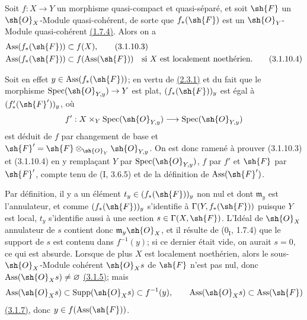 \begin{remark}[3.1.10.2]
\label{IV.3.1.10.2}
Soit $f:X\to Y$ un morphisme quasi-compact et quasi-séparé, et soit
$\sh{F}$ un $\sh{O}_X$-Module quasi-cohérent, de sorte que
$f_*(\sh{F})$ est un $\sh{O}_Y$-Module quasi-cohérent
{\hyperref[canon-index.ega4.c04.statement.1-7-4]{(1.7.4)}}. Alors on a
\begin{align}
 \operatorname{Ass}(f_*(\sh{F}))&\subset f(X),
 \label{IV.3.1.10.3}\tag{3.1.10.3}\\
 \operatorname{Ass}(f_*(\sh{F}))&\subset f(\operatorname{Ass}(\sh{F}))
 \quad\text{si $X$ est localement noethérien}.
 \label{IV.3.1.10.4}\tag{3.1.10.4}
\end{align}

Soit en effet $y\in\operatorname{Ass}(f_*(\sh{F}))$; en vertu de
{\hyperref[canon-index.ega4.c04.lem.2-3-1]{(2.3.1)}} et du fait que le morphisme
$\operatorname{Spec}(\sh{O}_{Y,y})\to Y$ est plat,
$(f_*(\sh{F}))_y$ est égal à $(f'_*(\sh{F}'))_y$, où
\[
 f':X\times_Y\operatorname{Spec}(\sh{O}_{Y,y})
 \longrightarrow\operatorname{Spec}(\sh{O}_{Y,y})
\]
est déduit de $f$ par changement de base et
$\sh{F}'=\sh{F}\otimes_{\sh{O}_Y}\sh{O}_{Y,y}$. On est donc ramené à
prouver (3.1.10.3) et (3.1.10.4) en y remplaçant $Y$ par
$\operatorname{Spec}(\sh{O}_{Y,y})$, $f$ par $f'$ et $\sh{F}$ par
$\sh{F}'$, compte tenu de (I, 3.6.5) et de la définition de
$\operatorname{Ass}(\sh{F}')$.

Par définition, il y a un élément
$t_y\in(f_*(\sh{F}))_y$ non nul et dont $\mathfrak m_y$ est
l'annulateur, et comme $(f_*(\sh{F}))_y$ s'identifie à
$\Gamma(Y,f_*(\sh{F}))$ puisque $Y$ est local, $t_y$ s'identifie aussi
à une section $s\in\Gamma(X,\sh{F})$. L'Idéal de $\sh{O}_X$ annulateur
de $s$ contient donc $\mathfrak m_y\sh{O}_X$, et il résulte de
($0_{\mathrm I}$, 1.7.4) que le support de $s$ est contenu dans
$f^{-1}(y)$; si ce dernier était vide, on aurait $s=0$, ce qui est
absurde. Lorsque de plus $X$ est localement noethérien, alors le
sous-$\sh{O}_X$-Module cohérent $\sh{O}_Xs$ de $\sh{F}$ n'est pas nul,
donc $\operatorname{Ass}(\sh{O}_Xs)\neq\varnothing$
{\hyperref[canon-index.ega4.c04.cor.3-1-5]{(3.1.5)}}; mais
\[
 \operatorname{Ass}(\sh{O}_Xs)\subset
 \operatorname{Supp}(\sh{O}_Xs)\subset f^{-1}(y),\qquad
 \operatorname{Ass}(\sh{O}_Xs)\subset\operatorname{Ass}(\sh{F})
\]
{\hyperref[canon-index.ega4.c04.prop.3-1-7]{(3.1.7)}}, donc
$y\in f(\operatorname{Ass}(\sh{F}))$.
\end{remark}


